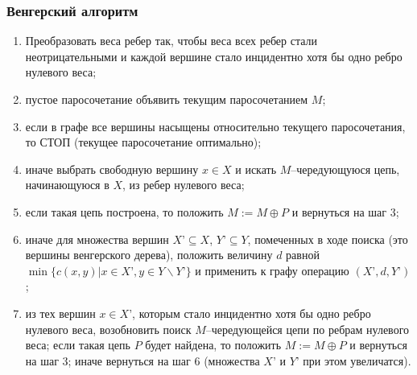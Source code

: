 \subsubsection{Венгерский алгоритм}
\begin{enumerate}
\item Преобразовать веса ребер так, чтобы веса всех ребер стали неотрицательными и каждой вершине стало инцидентно хотя бы одно ребро нулевого веса;

\item пустое паросочетание объявить текущим паросочетанием $M$;

\item если в графе все вершины насыщены относительно текущего паросочетания, то СТОП (текущее паросочетание оптимально);

\item иначе выбрать свободную вершину $x\in X$ и искать $M$--чере\-ду\-ющую\-ся цепь, начинающуюся в $X$, из ребер нулевого веса;

\item если такая цепь построена, то положить $M:=M\oplus P$ и вернуться на шаг 3;

\item иначе для множества вершин $X’\subseteq X$, $Y’\subseteq Y$, помеченных в ходе поиска (это вершины венгерского дерева), положить величину $d$ равной $\min\{c(x,y)|x\in X’, y\in Y\backslash Y’\}$ и применить к графу операцию $(X’,d,Y’)$;

\item из тех вершин $x\in X’$, которым стало инцидентно хотя бы одно ребро нулевого веса, возобновить поиск $M$--чередующейся цепи по ребрам нулевого веса; если такая цепь $P$ будет найдена, то положить $M:=M\oplus P$ и вернуться на шаг 3; иначе вернуться на шаг 6  (множества $X’$ и $Y’$ при этом увеличатся).
\end{enumerate}